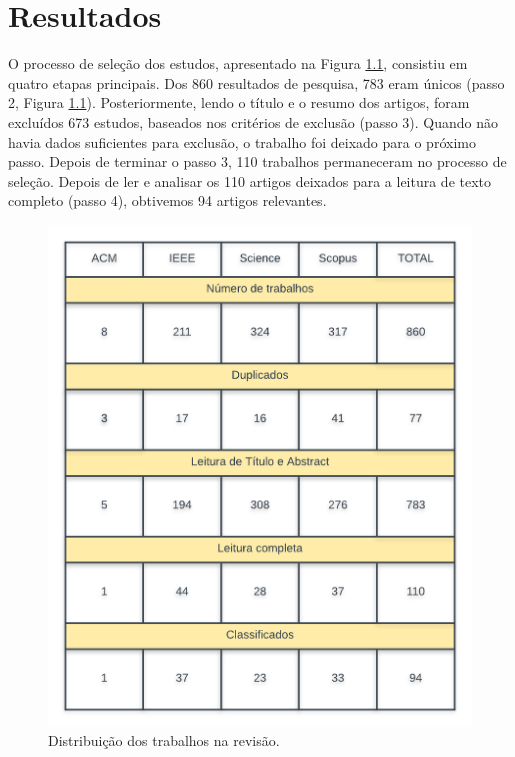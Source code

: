 \chapter{Resultados}

O processo de seleção dos estudos, apresentado na Figura \ref{fig:dist}, consistiu em quatro etapas principais. Dos 860 resultados de pesquisa, 783 eram únicos (passo 2, Figura \ref{fig:dist}). Posteriormente, lendo o título e o resumo dos artigos, foram excluídos 673 estudos, baseados nos critérios de exclusão (passo 3). Quando não havia dados suficientes para exclusão, o trabalho foi deixado para o próximo passo. Depois de terminar o passo 3, 110 trabalhos permaneceram no processo de seleção. Depois de ler e analisar os 110 artigos deixados para a leitura de texto completo (passo 4), obtivemos 94 artigos relevantes. 

\begin{figure}[h!] %
	\caption{Distribuição dos trabalhos na revisão.}
	\begin{center}
	    \includegraphics[scale=0.3]{figuras/revvisao.png} %
	\end{center}
	\label{fig:dist}
\end{figure}

